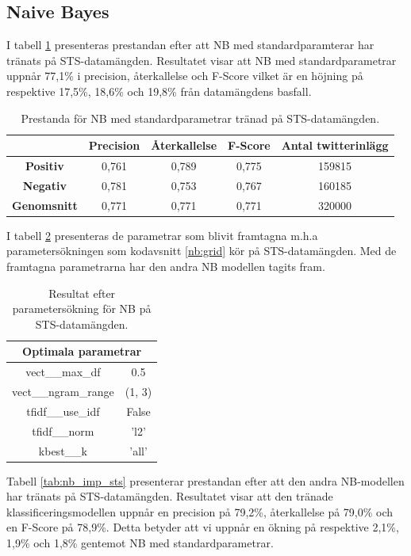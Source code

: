 \documentclass{kaumasters} %
\begin{document}
\subsection{Naive Bayes}
I tabell \ref{tab:nb_base_sts} presenteras prestandan efter att NB med standardparamterar har tränats på STS-datamängden. Resultatet visar att NB med standardparametrar uppnår 77,1\% i precision, återkallelse och F-Score vilket är en höjning på respektive 17,5\%, 18,6\% och 19,8\% från datamängdens basfall.

\begin{table}[H]
\centering
\caption{Prestanda för NB med standardparametrar tränad på STS-datamängden.}
\label{tab:nb_base_sts}
    \begin{tabular}{ccccc}
    \toprule
     & \textbf{Precision} & \textbf{Återkallelse} & \textbf{F-Score} & \textbf{Antal twitterinlägg}  \\
    \midrule
    \textbf{Positiv} & 0,761 & 0,789 & 0,775 & 159815 \\
    \textbf{Negativ} & 0,781 & 0,753 & 0,767 & 160185 \\
    \midrule
    \textbf{Genomsnitt} & 0,771 & 0,771 & 0,771  & 320000 \\
    \bottomrule
\end{tabular}
\end{table}

I tabell \ref{tab:nb_grid_sts} presenteras de parametrar som blivit framtagna m.h.a parametersökningen som kodavsnitt \ref{nb:grid} kör på STS-datamängden. Med de framtagna parametrarna har den andra NB modellen tagits fram. 

\begin{table}[H]
\centering
\caption{Resultat efter parametersökning för NB på STS-datamängden.}
\label{tab:nb_grid_sts}
    \begin{tabular}{cc}
    \toprule
    \multicolumn{2}{c}{\textbf{Optimala parametrar}} \\
    \midrule
    vect\_\_max\_df & 0.5  \\
    vect\_\_ngram\_range & (1, 3)  \\
    tfidf\_\_use\_idf & False  \\
    tfidf\_\_norm & 'l2'  \\
    kbest\_\_k & 'all' \\
    \bottomrule
\end{tabular}
\end{table}

Tabell \ref{tab:nb_imp_sts} presenterar prestandan efter att den andra NB-modellen har tränats på STS-datamängden. Resultatet visar att den tränade klassificeringsmodellen uppnår en precision på 79,2\%, återkallelse på 79,0\% och en F-Score på 78,9\%. Detta betyder att vi uppnår en ökning på respektive 2,1\%, 1,9\% och 1,8\% gentemot NB med standardparametrar. 
\end{document}
